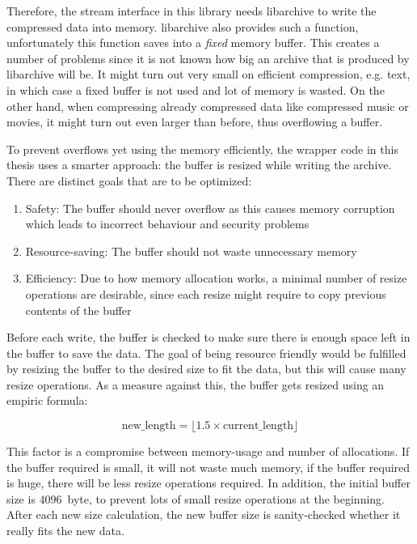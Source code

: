 \documentclass[parskip=half]{scrreprt}
\begin{document}
Therefore, the stream interface in this library needs libarchive to write the
compressed data into memory. libarchive also provides such a function,
unfortunately this function saves into a \emph{fixed} memory buffer. This
creates a number of problems since it is not known how big an archive that is
produced by libarchive will be. It might turn out very small on efficient
compression, e.g. text, in which case a fixed buffer is not used and lot of
memory is wasted. On the other hand, when compressing already compressed data
like compressed music or movies, it might turn out even larger than before,
thus overflowing a buffer.

To prevent overflows yet using the memory efficiently, the wrapper code in this
thesis uses a smarter approach: the buffer is resized while writing the
archive. There are distinct goals that are to be optimized:

\begin{enumerate}
  \item Safety: The buffer should never overflow as this causes memory
    corruption which leads to incorrect behaviour and security problems
  \item Resource-saving: The buffer should not waste unnecessary memory
  \item Efficiency: Due to how memory allocation works, a minimal number
    of resize operations are desirable, since each resize might require
    to copy previous contents of the buffer
\end{enumerate}

Before each write, the buffer is checked to make sure there is enough space
left in the buffer to save the data. The goal of being resource friendly would
be fulfilled by resizing the buffer to the desired size to fit the data, but
this will cause many resize operations. As a measure against this, the buffer
gets resized using an empiric formula:

\begin{displaymath}
\text{new\_length} = \lfloor 1.5 \times \text{current\_length} \rfloor
\end{displaymath}

This factor is a compromise between memory-usage and number of allocations. If
the buffer required is small, it will not waste much memory, if the buffer
required is huge, there will be less resize operations required. In addition,
the initial buffer size is $4096$~byte, to prevent lots of small resize
operations at the beginning. After each new size calculation, the new buffer
size is sanity-checked whether it really fits the new data.
\end{document}
